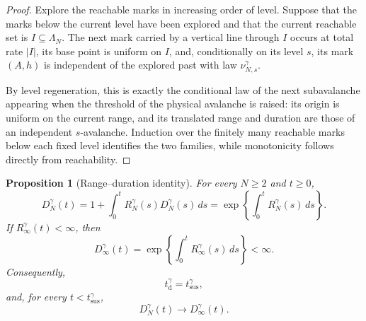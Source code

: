 \documentclass[11pt,a4paper]{amsart}
\newtheorem{proposition}[theorem]{Proposition}
\theoremstyle{remark}
\begin{document}
\begin{proof}
Explore the reachable marks in increasing order of level. Suppose that
the marks below the current level have been explored and that the
current reachable set is $I\subseteq\Lambda_N$. The next mark carried
by a vertical line through $I$ occurs at total rate $|I|$, its base
point is uniform on $I$, and, conditionally on its level $s$, its mark
$(A,h)$ is independent of the explored past with law
$\nu_{N,s}^\gamma$.

By level regeneration, this is exactly the conditional law of the next
subavalanche appearing when the threshold of the physical avalanche is
raised: its origin is uniform on the current range, and its translated
range and duration are those of an independent $s$-avalanche.
Induction over the finitely many reachable marks below each fixed level
identifies the two families, while monotonicity follows directly from
reachability.
\end{proof}



\begin{proposition}[Range--duration identity]
\label{prop:app-range-duration}
For every $N\geq2$ and $t\geq0$,
\begin{equation}
\label{eq:app-finite-duration}
        D_N^\gamma(t)
        =
        1+\int_0^tR_N^\gamma(s)D_N^\gamma(s)\,ds
        =
        \exp\left\{\int_0^tR_N^\gamma(s)\,ds\right\}.
\end{equation}
If $R_\infty^\gamma(t)<\infty$, then
\begin{equation}
\label{eq:app-infinite-duration}
        D_\infty^\gamma(t)
        =
        \exp\left\{\int_0^tR_\infty^\gamma(s)\,ds\right\}<\infty.
\end{equation}
Consequently,
\[
        t_{\mathrm d}^\gamma=t_{\mathrm{sus}}^\gamma,
\]
and, for every $t<t_{\mathrm{sus}}^\gamma$,
\begin{equation}
\label{eq:app-duration-convergence}
        D_N^\gamma(t)\longrightarrow D_\infty^\gamma(t).
\end{equation}
\end{proposition}
\end{document}
